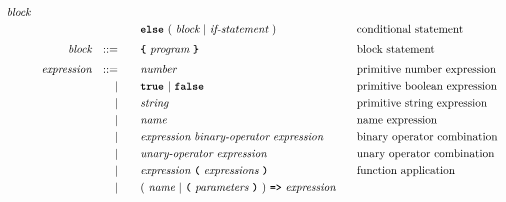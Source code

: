 \begin{alignat*}{9}
                                   \textit{block} \\
&&                       &&     &      && \textbf{\texttt{else}}\
                                          (\ \textit{block}
                                          \ | \
                                          \textit{if-statement} \ )
                                                            && \textrm{conditional statement}   \\[1mm]
&& \textit{block}        && ::= &      && \textbf{\texttt{\{}}\  \textit{program}   \ \textbf{\texttt{\}}} \quad
                                                           && \textrm{block statement}\\[1mm]         
&& \textit{expression}   && ::= &\quad &&  \textit{number}   && \textrm{primitive number expression}\\
&&                       && |   &\quad && \textbf{\texttt{true}}\ |\ \textbf{\texttt{false}}
                                                           && \textrm{primitive boolean expression}\\
&&                       && |   &\quad &&  \textit{string}   && \textrm{primitive string expression}\\
&&                       && |   &\quad &&  \textit{name}   && \textrm{name expression}\\
&&                       && |   &\quad &&  \textit{expression} \  \textit{binary-operator} \ 
                                            \textit{expression} \qquad
                                                           && \textrm{binary operator combination}\\
&&                       && |   &\quad &&   \textit{unary-operator} \ 
                                            \textit{expression}
                                                           && \textrm{unary operator combination}\\
&&                       && |   &\quad &&   \textit{expression} \ 
                                            \textbf{\texttt{(}}\ \textit{expressions}\
                                            \textbf{\texttt{)}}
                                                           && \textrm{function application}\\
&&                       && |   &\quad &&   (\ \textit{name}\ | \
                                               \textbf{\texttt{(}}\ \textit{parameters}\ \textbf{\texttt{)}}\
                                            )\    
                                            \texttt{\textbf{=>}}\ \textit{expression}

\end{alignat*}
